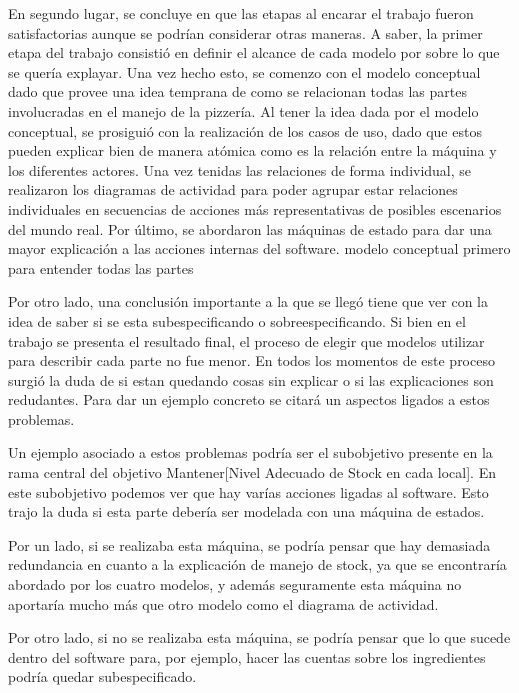 \documentclass[a4paper,10pt]{article}
\begin{document}
En segundo lugar, se concluye en que las etapas al encarar el trabajo fueron satisfactorias aunque se podr\'ian considerar otras maneras.
A saber, la primer etapa del trabajo consisti\'o en definir el alcance de cada modelo por sobre lo que se quer\'ia explayar. Una vez hecho esto, 
se comenzo con el modelo conceptual dado que provee una idea temprana de como se relacionan todas las partes involucradas en el manejo de la pizzer\'ia.
Al tener la idea dada por el modelo conceptual, se prosigui\'o con la realizaci\'on de los casos de uso, dado que estos pueden explicar bien de manera
at\'omica como es la relaci\'on entre la m\'aquina y los diferentes actores. Una vez tenidas las relaciones de forma individual, se realizaron los 
diagramas de actividad para poder agrupar estar relaciones individuales en secuencias de acciones m\'as representativas de posibles escenarios del mundo real.
Por \'ultimo, se abordaron las m\'aquinas de estado para dar una mayor explicaci\'on a las acciones internas del software.
modelo conceptual primero para entender todas las partes

\medskip

Por otro lado, una conclusi\'on importante a la que se lleg\'o tiene que ver con la idea de saber si se esta subespecificando o sobreespecificando.
Si bien en el trabajo se presenta el resultado final, el proceso de elegir que modelos utilizar para describir cada parte no fue menor. En todos
los momentos de este proceso surgi\'o la duda de si estan quedando cosas sin explicar o si las explicaciones son redudantes. Para dar un ejemplo 
concreto se citar\'a un aspectos ligados a estos problemas. 

Un ejemplo asociado a estos problemas podr\'ia ser el subobjetivo presente en la rama central del objetivo Mantener[Nivel Adecuado de Stock en cada local].
En este subobjetivo podemos ver que hay var\'ias acciones ligadas al software. Esto trajo la duda si esta parte deber\'ia ser modelada con una
m\'aquina de estados.

 Por un lado, si se realizaba esta m\'aquina, se podr\'ia pensar que hay demasiada redundancia en cuanto a la explicaci\'on
de manejo de stock, ya que se encontrar\'ia abordado por los cuatro modelos, y adem\'as seguramente esta m\'aquina no aportar\'ia mucho m\'as que otro
modelo como el diagrama de actividad.

Por otro lado, si no se realizaba esta m\'aquina, se podr\'ia pensar que lo que sucede dentro del software para, por ejemplo, hacer las cuentas sobre los ingredientes
podr\'ia quedar subespecificado.
\end{document}
